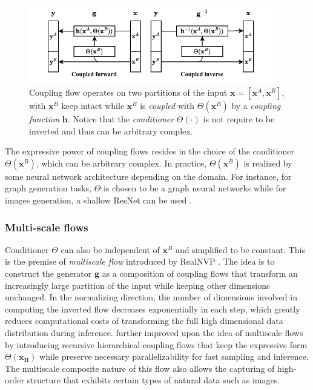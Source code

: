 \begin{figure}
  \begin{center}
    \includegraphics[width=0.95\textwidth]{figures/couplingflow.pdf}
  \end{center}
  \caption{Coupling flow operates on two partitions of the input
  $\mathbf{x} = [\mathbf{x}^A, \mathbf{x}^B]$, with $\mathbf{x}^B$ keep intact while $\mathbf{x}^B$ is \textit{coupled} with $\Theta(\mathbf{x}^B)$ by a \textit{coupling function} $\mathbf{h}$. Notice that the \textit{conditioner} $\Theta(\cdot)$ is not require to be inverted and thus can be arbitrary complex.}
  \label{fig:couplingflow}
\end{figure}


The expressive power of coupling flows resides in the choice of the conditioner
$\Theta(\mathbf{x}^B)$, which can be arbitrary complex. In practice,
$\Theta(\mathbf{x}^B)$ is realized by some neural network architecture depending
on the domain. For
instance, for graph generation tasks, $\Theta$ is chosen to be a graph neural
networks \citep{zangMoFlowInvertibleFlow2020} while for images generation, a
shallow ResNet can be used \citep{kingmaGlowGenerativeFlow2018}.

\subsubsection{Multi-scale flows}

Conditioner $\Theta$ can also be independent of $\textbf{x}^B$ and simplified to
be constant. This is the premise of \textit{multiscale flow} introduced by
RealNVP \citep{dinhDensityEstimationUsing2017}. The idea is to construct the generator
$\textbf{g}$ as a composition of coupling flows that transform an
increasingly large partition of the input while keeping other dimensions
unchanged. In the normalizing direction, the number of dimensions involved in
computing the inverted flow decreases exponentially in each
step, which greatly reduces computational costs of transforming the full
high dimensional data distribution during inference.
\citep{kruseHINTHierarchicalInvertible2021} further improved upon the idea of
multiscale flows by introducing recursive hierarchical coupling flows that
keep the expressive form $\Theta(\mathbf{x_B})$ while preserve necessary parallelizability for fast
sampling and inference. The multiscale composite nature of this
flow also allows the capturing of high-order structure that exhibits certain
types of natural data such as images.

